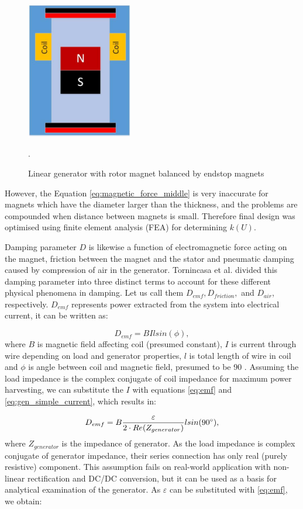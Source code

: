 \begin{figure}[htb]
\begin{center}
\includegraphics[height=6cm]{images/own_dwg/generator}
\end{center}
\caption{Linear generator with rotor magnet balanced by endstop magnets}.
\label{fig:lg}
\end{figure}

However, the Equation \eqref{eq:magnetic_force_middle} is very inaccurate for magnets which have the diameter larger than the thickness, and the problems are compounded when distance between magnets is small. Therefore final design was optimised using finite element analysis (FEA) for determining $k(U)$. 

Damping parameter $D$ is likewise a function of electromagnetic force acting on the magnet, friction between the magnet and the stator and pneumatic damping caused by compression of air in the generator. Tornincasa et al. \cite{Tornincasa2012} divided this damping parameter into three distinct terms to account for these different physical phenomena in damping. Let us call them $D_{emf}, D_{friction},$ and $D_{air}$, respectively. $D_{emf}$ represents power extracted from the system into electrical current, it can be written as:

\begin{equation}\label{eq:d_emd}
  D_{emf} = BIlsin(\phi),
\end{equation}
where $B$ is magnetic field affecting coil (presumed constant), $I$ is current through wire depending on load and generator properties, $l$ is total length of wire in coil and $\phi$ is angle between coil and magnetic field, presumed to be 90 \degree. Assuming the load impedance is the complex conjugate of coil impedance for maximum power harvesting, we can substitute the $I$ with equations \eqref{eq:emf} and \eqref{eq:gen_simple_current}, which results in: 

\begin{equation}
  D_{emf} = B \frac{\varepsilon}{2 \cdot Re(Z_{generator})} l sin(90 \degree),
\end{equation}
where $Z_{generator}$ is the impedance of generator. As the load impedance is complex conjugate of generator impedance, their series connection has only real (purely resistive) component. This assumption fails on real-world application with non-linear rectification and DC/DC conversion, but it can be used as a basis for analytical examination of the generator. As $\varepsilon$ can be substituted with \eqref{eq:emf}, we obtain:

